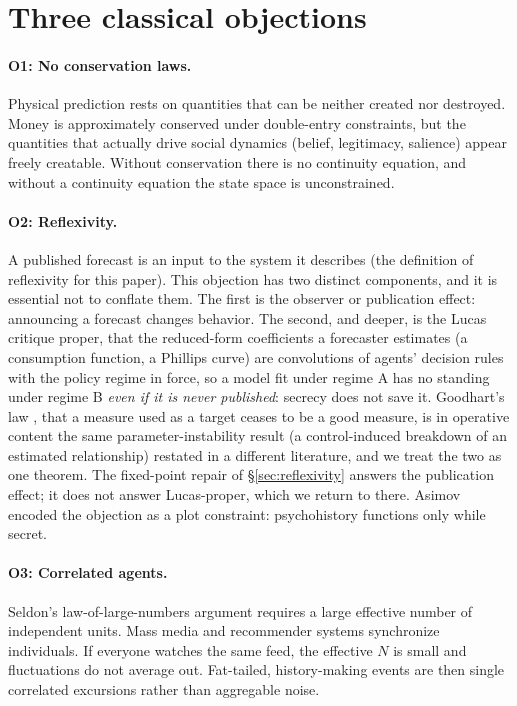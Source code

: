 \documentclass[11pt]{article}
\begin{document}
\section{Three classical objections}
\label{sec:objections}

\paragraph{O1: No conservation laws.} Physical prediction rests on quantities that can be neither created nor destroyed. Money is approximately conserved under double-entry constraints, but the quantities that actually drive social dynamics (belief, legitimacy, salience) appear freely creatable. Without conservation there is no continuity equation, and without a continuity equation the state space is unconstrained.

\paragraph{O2: Reflexivity.} A published forecast is an input to the system it describes (the definition of reflexivity for this paper). This objection has two distinct components, and it is essential not to conflate them. The first is the observer or publication effect: announcing a forecast changes behavior. The second, and deeper, is the Lucas critique \cite{lucas1976} proper, that the reduced-form coefficients a forecaster estimates (a consumption function, a Phillips curve) are convolutions of agents' decision rules with the policy regime in force, so a model fit under regime A has no standing under regime B \emph{even if it is never published}: secrecy does not save it. Goodhart's law \cite{goodhart1975}, that a measure used as a target ceases to be a good measure, is in operative content the same parameter-instability result (a control-induced breakdown of an estimated relationship) restated in a different literature, and we treat the two as one theorem. The fixed-point repair of \S\ref{sec:reflexivity} answers the publication effect; it does not answer Lucas-proper, which we return to there. Asimov encoded the objection as a plot constraint: psychohistory functions only while secret.

\paragraph{O3: Correlated agents.} Seldon's law-of-large-numbers argument requires a large effective number of independent units. Mass media and recommender systems synchronize individuals. If everyone watches the same feed, the effective $N$ is small and fluctuations do not average out. Fat-tailed, history-making events are then single correlated excursions rather than aggregable noise.
\end{document}

